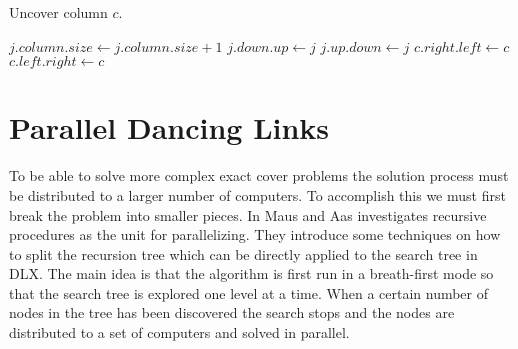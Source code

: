 \begin{algorithm}[p]
	\caption{Uncover column $c$.}
	\label{alg:uncover}
	\begin{distribalgo}[1]
					\STATE $j.column.size \leftarrow j.column.size + 1$
					\STATE $j.down.up \leftarrow j$  
					\STATE $j.up.down \leftarrow j$
				\ENDFOR
			\ENDFOR
			\STATE $c.right.left \leftarrow c$  
			\STATE $c.left.right \leftarrow c$
		\ENDPROC
	\end{distribalgo}
\end{algorithm}



\section{Parallel Dancing Links}

To be able to solve more complex exact cover problems the solution process must be distributed to a larger number of computers.
To accomplish this we must first break the problem into smaller pieces.
In \cite{maus-prp} Maus and Aas investigates recursive procedures as the unit for parallelizing.
They introduce some techniques on how to split the recursion tree which can be directly applied to the search tree in DLX.
The main idea is that the algorithm is first run in a breath-first mode so that the search tree is explored one level at a time.
When a certain number of nodes in the tree has been discovered the search stops and the nodes are distributed to a set of computers and solved in parallel.


